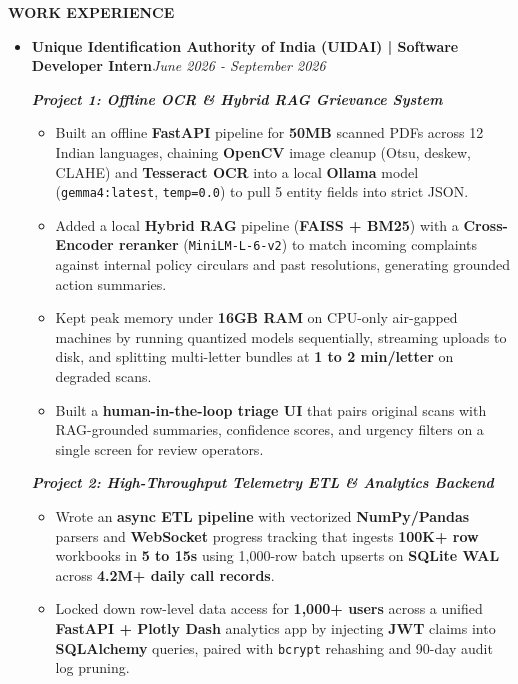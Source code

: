 \documentclass[10pt]{article}
\newcommand{\resheading}[1]{{\small \colorbox{mygrey}{\begin{minipage}{\dimexpr\textwidth-2\fboxsep\relax}\textbf{#1 \vphantom{p\^{E}}}\end{minipage}}}}
\begin{document}
\vspace{3pt}
\noindent
\resheading{WORK EXPERIENCE}
\begin{itemize}[leftmargin=*]\small
\item \textbf{Unique Identification Authority of India (UIDAI) | Software Developer Intern}\hfill \textit{June 2026 - September 2026}

\vspace{2pt}
\textit{\textbf{Project 1: Offline OCR \& Hybrid RAG Grievance System}}
\begin{itemize}[noitemsep, leftmargin=*]\footnotesize
\item Built an offline \textbf{FastAPI} pipeline for \textbf{50MB} scanned PDFs across 12 Indian languages, chaining \textbf{OpenCV} image cleanup (Otsu, deskew, CLAHE) and \textbf{Tesseract OCR} into a local \textbf{Ollama} model (\texttt{gemma4:latest}, \texttt{temp=0.0}) to pull 5 entity fields into strict JSON.
\item Added a local \textbf{Hybrid RAG} pipeline (\textbf{FAISS + BM25}) with a \textbf{Cross-Encoder reranker} (\texttt{MiniLM-L-6-v2}) to match incoming complaints against internal policy circulars and past resolutions, generating grounded action summaries.
\item Kept peak memory under \textbf{16GB RAM} on CPU-only air-gapped machines by running quantized models sequentially, streaming uploads to disk, and splitting multi-letter bundles at \textbf{1 to 2 min/letter} on degraded scans.
\item Built a \textbf{human-in-the-loop triage UI} that pairs original scans with RAG-grounded summaries, confidence scores, and urgency filters on a single screen for review operators.
\end{itemize}

\vspace{2pt}
\textit{\textbf{Project 2: High-Throughput Telemetry ETL \& Analytics Backend}}
\begin{itemize}[noitemsep, leftmargin=*]\footnotesize
\item Wrote an \textbf{async ETL pipeline} with vectorized \textbf{NumPy/Pandas} parsers and \textbf{WebSocket} progress tracking that ingests \textbf{100K+ row} workbooks in \textbf{5 to 15s} using 1,000-row batch upserts on \textbf{SQLite WAL} across \textbf{4.2M+ daily call records}.
\item Locked down row-level data access for \textbf{1,000+ users} across a unified \textbf{FastAPI + Plotly Dash} analytics app by injecting \textbf{JWT} claims into \textbf{SQLAlchemy} queries, paired with \texttt{bcrypt} rehashing and 90-day audit log pruning.
\end{itemize}
\end{itemize}
\end{document}
